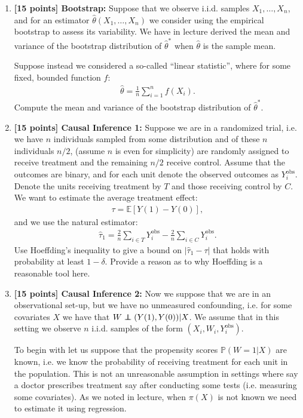 \documentclass[12pt]{article}
\newcommand\independent{\protect\mathpalette{\protect\independenT}{\perp}}
\def\independenT#1#2{\mathrel{\rlap{$#1#2$}\mkern2mu{#1#2}}}
\begin{document}
\begin{enumerate}
\item {\bf [15 points] Bootstrap: } Suppose that we observe i.i.d. samples $X_1,\ldots,X_n$, and for an estimator $\widehat{\theta}(X_1,\ldots,X_n)$ we consider using the empirical bootstrap to assess its variability. 
We have in lecture derived the mean and variance of the bootstrap distribution of $\widehat{\theta}^*$ when $\widehat{\theta}$ is the sample mean. 

Suppose instead we considered a so-called ``linear statistic'', where for some fixed, bounded function $f$:
\begin{align*}
\widehat{\theta} = \frac{1}{n} \sum_{i=1}^n f(X_i).
\end{align*}
Compute the mean and variance of the bootstrap distribution of $\widehat{\theta}^*$.


\item {\bf [15 points] Causal Inference 1: } Suppose we are in a randomized trial, i.e. we have $n$ individuals sampled from some distribution and of these $n$ individuals $n/2$, (assume $n$ is even for simplicity)
are randomly assigned to receive treatment and the remaining $n/2$ receive control. Assume that the outcomes are binary, and for each unit denote the observed outcomes as $Y_i^{\text{obs}}$. Denote the units receiving treatment by $T$ and those receiving control by $C$.
We want to estimate the average treatment effect:
\begin{align*}
\tau = \mathbb{E}[Y(1) - Y(0)], 
\end{align*}
and we use the natural estimator:
\begin{align*}
\widehat{\tau}_1 = \frac{2}{n} \sum_{i \in T} Y_i^{\text{obs}} - \frac{2}{n} \sum_{i \in C} Y_i^{\text{obs}}.
\end{align*}
Use Hoeffding's inequality to give a bound on $|\widehat{\tau}_1 - \tau|$ that holds with probability at least $1 - \delta$. Provide a reason as to why Hoeffding is a reasonable tool here.

\item {\bf [15 points] Causal Inference 2: } Now we suppose that we are in an observational set-up, but we have no unmeasured confounding, i.e. for some covariates $X$ we have that $W \independent (Y(1),Y(0)) | X$. We assume that in this setting we observe $n$ i.i.d. samples of the form $(X_i, W_i, Y_i^{\text{obs}})$.

To begin with let us suppose that the propensity scores $\mathbb{P}(W = 1 | X)$ are known, i.e. we know the probability of receiving treatment for each unit in the population. This is not an unreasonable assumption in settings where say a doctor prescribes treatment say after conducting some tests (i.e. measuring some covariates). As we noted in lecture, when $\pi(X)$ is not known we need to estimate it using regression. 



\end{enumerate}
\end{document}
